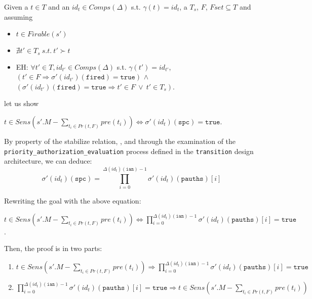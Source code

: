 \documentclass[dvipsnames,12pt]{article}
\begin{document}
\begin{niproof}

  Given a $t\in{}T$ and an $id_t\in{}Comps(\Delta)$
  s.t. $\gamma(t)=id_t$, a $T_s$, $F$, $Fset\subseteq{}T$ and assuming
  \begin{itemize}
  \item $t\in{}Firable(s')$
  \item $\nexists{}t'\in{}T_s~s.t.~t'\succ{}t$
  \item EH: $\forall{}t'\in{}T,id_{t'}\in{}Comps(\Delta)$
    s.t. $\gamma(t')=id_{t'}$,\\
    $(t'\in{}F\Rightarrow\sigma'(id_{t'})(\texttt{fired})=\mathtt{true})$
    $\land$
    $(\sigma'(id_{t'})(\texttt{fired})=\mathtt{true}\Rightarrow{}t'\in{}F~\lor~{}t'\in{}T_s)$.
  \end{itemize}
  
  let us show
  \begin{frameb}
    $t\in{}Sens(s'.M-\sum\limits_{t_i\in{}Pr(t,F)}pre(t_i))\Leftrightarrow\sigma'(id_t)(\texttt{spc})=\mathtt{true}$.
  \end{frameb}

  \exT{}
  
  By property of the stabilize relation, \InCsCompT, and through the
  examination of the \texttt{priority_authorization_evaluation}
  process defined in the \texttt{transition} design architecture, we
  can deduce:
  \begin{equation*}
    \sigma'(id_t)(\texttt{spc})=\prod\limits_{i=0}^{\Delta(id_t)(\texttt{ian})-1}\sigma'(id_t)(\texttt{pauths})[i]\label{eq:frd-eq-spc-prod-pauths}
  \end{equation*}

  Rewriting the goal with the above equation:  
  \begin{frameb}
    $t\in{}Sens(s'.M-\sum\limits_{t_i\in{}Pr(t,F)}pre(t_i))\Leftrightarrow\prod\limits_{i=0}^{\Delta(id_t)(\texttt{ian})-1}\sigma'(id_t)(\texttt{pauths})[i]=\mathtt{true}$.
  \end{frameb}
  
  Then, the proof is in two parts:
  \begin{enumerate}
  \item
    $t\in{}Sens(s'.M-\sum\limits_{t_i\in{}Pr(t,F)}pre(t_i))\Rightarrow\prod\limits_{i=0}^{\Delta(id_t)(\texttt{ian})-1}\sigma'(id_t)(\texttt{pauths})[i]=\mathtt{true}$
  \item
    $\prod\limits_{i=0}^{\Delta(id_t)(\texttt{ian})-1}\sigma'(id_t)(\texttt{pauths})[i]=\mathtt{true}\Rightarrow{}t\in{}Sens(s'.M-\sum\limits_{t_i\in{}Pr(t,F)}pre(t_i))$
  \end{enumerate}


\end{niproof}
\end{document}
